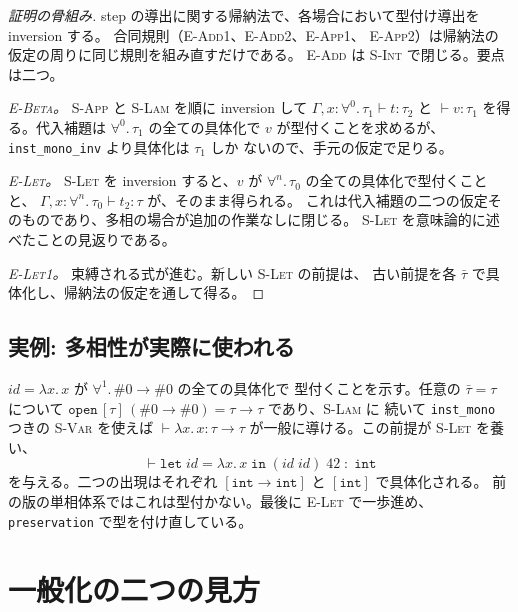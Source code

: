 \documentclass[11pt,a4paper]{ltjsarticle}
\newcommand{\tint}{\mathtt{int}}
\begin{document}
\begin{proof}[証明の骨組み]
step の導出に関する帰納法で、各場合において型付け導出を inversion する。
合同規則（\textsc{E-Add1}、\textsc{E-Add2}、\textsc{E-App1}、
\textsc{E-App2}）は帰納法の仮定の周りに同じ規則を組み直すだけである。
\textsc{E-Add} は \textsc{S-Int} で閉じる。要点は二つ。

\emph{\textsc{E-Beta}。} \textsc{S-App} と \textsc{S-Lam} を順に inversion して
$\Gamma, x{:}\forall^{0}.\,\tau_1 \vdash t : \tau_2$ と
$\vdash v : \tau_1$ を得る。代入補題は $\forall^{0}.\,\tau_1$ の全ての具体化で
$v$ が型付くことを求めるが、\texttt{inst\_mono\_inv} より具体化は $\tau_1$ しか
ないので、手元の仮定で足りる。

\emph{\textsc{E-Let}。} \textsc{S-Let} を inversion すると、$v$ が
$\forall^{n}.\,\tau_0$ の全ての具体化で型付くことと、
$\Gamma, x{:}\forall^{n}.\,\tau_0 \vdash t_2 : \tau$ が、そのまま得られる。
これは代入補題の二つの仮定そのものであり、多相の場合が追加の作業なしに閉じる。
\textsc{S-Let} を意味論的に述べたことの見返りである。

\emph{\textsc{E-Let1}。} 束縛される式が進む。新しい \textsc{S-Let} の前提は、
古い前提を各 $\bar\tau$ で具体化し、帰納法の仮定を通して得る。
\end{proof}

\subsection{実例: 多相性が実際に使われる}

$\mathit{id} = \lambda x.\,x$ が $\forall^{1}.\,\#0 \to \#0$ の全ての具体化で
型付くことを示す。任意の $\bar\tau = \tau$ について
$\mathtt{open}\,[\tau]\,(\#0 \to \#0) = \tau \to \tau$ であり、\textsc{S-Lam} に
続いて \texttt{inst\_mono} つきの \textsc{S-Var} を使えば
$\vdash \lambda x.\,x : \tau \to \tau$ が一般に導ける。この前提が
\textsc{S-Let} を養い、
\[
  \vdash \mathtt{let}\;\mathit{id} = \lambda x.\,x\;\mathtt{in}\;
  (\mathit{id}\;\mathit{id})\;42 \;:\; \tint
\]
を与える。二つの出現はそれぞれ $[\tint \to \tint]$ と $[\tint]$ で具体化される。
前の版の単相体系ではこれは型付かない。最後に \textsc{E-Let} で一歩進め、
\texttt{preservation} で型を付け直している。

\section{一般化の二つの見方}
\end{document}
